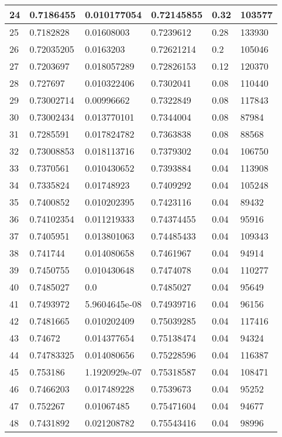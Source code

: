 \begin{longtable}{|l|l|l|l|l|l|}
24 & 0.7186455 & 0.010177054 & 0.72145855 & 0.32 & 103577 \\ \hline 
25 & 0.7182828 & 0.01608003 & 0.7239612 & 0.28 & 133930 \\ \hline 
26 & 0.72035205 & 0.0163203 & 0.72621214 & 0.2 & 105046 \\ \hline 
27 & 0.7203697 & 0.018057289 & 0.72826153 & 0.12 & 120370 \\ \hline 
28 & 0.727697 & 0.010322406 & 0.7302041 & 0.08 & 110440 \\ \hline 
29 & 0.73002714 & 0.00996662 & 0.7322849 & 0.08 & 117843 \\ \hline 
30 & 0.73002434 & 0.013770101 & 0.7344004 & 0.08 & 87984 \\ \hline 
31 & 0.7285591 & 0.017824782 & 0.7363838 & 0.08 & 88568 \\ \hline 
32 & 0.73008853 & 0.018113716 & 0.7379302 & 0.04 & 106750 \\ \hline 
33 & 0.7370561 & 0.010430652 & 0.7393884 & 0.04 & 113908 \\ \hline 
34 & 0.7335824 & 0.01748923 & 0.7409292 & 0.04 & 105248 \\ \hline 
35 & 0.7400852 & 0.010202395 & 0.7423116 & 0.04 & 89432 \\ \hline 
36 & 0.74102354 & 0.011219333 & 0.74374455 & 0.04 & 95916 \\ \hline 
37 & 0.7405951 & 0.013801063 & 0.74485433 & 0.04 & 109343 \\ \hline 
38 & 0.741744 & 0.014080658 & 0.7461967 & 0.04 & 94914 \\ \hline 
39 & 0.7450755 & 0.010430648 & 0.7474078 & 0.04 & 110277 \\ \hline 
40 & 0.7485027 & 0.0 & 0.7485027 & 0.04 & 95649 \\ \hline 
41 & 0.7493972 & 5.9604645e-08 & 0.74939716 & 0.04 & 96156 \\ \hline 
42 & 0.7481665 & 0.010202409 & 0.75039285 & 0.04 & 117416 \\ \hline 
43 & 0.74672 & 0.014377654 & 0.75138474 & 0.04 & 94324 \\ \hline 
44 & 0.74783325 & 0.014080656 & 0.75228596 & 0.04 & 116387 \\ \hline 
45 & 0.753186 & 1.1920929e-07 & 0.75318587 & 0.04 & 108471 \\ \hline 
46 & 0.7466203 & 0.017489228 & 0.7539673 & 0.04 & 95252 \\ \hline 
47 & 0.752267 & 0.01067485 & 0.75471604 & 0.04 & 94677 \\ \hline 
48 & 0.7431892 & 0.021208782 & 0.75543416 & 0.04 & 98996 \\ \hline 

\end{longtable}

